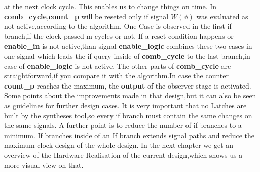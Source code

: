 at the next clock cycle. This enables us to change things on time. 
In \textbf{comb\_cycle},\textbf{count\_p} will be reseted only if signal $W(\phi)$ was evaluated as not active,according to the algorithm.
One Case is observed in the first if branch,if the clock passed m cycles or not. If a reset condition happens or \textbf{enable\_in}
is not active,than signal \textbf{enable\_logic} combines these two cases in one signal which leads the if query inside of \textbf{comb\_cycle} to the last branch,in case of \textbf{enable\_logic}
is not active. The other parts of \textbf{comb\_cycle} are straightforward,if you compare it with the algorithm.In case the counter \textbf{count\_p} reaches the maximum,
the  \textbf{output} of the observer stage is activated.\newline
Some points about the improvements made in that design,but it can also be seen as guidelines for further design cases.
It is very important that no Latches are built by the syntheses tool,so every if branch must contain the same changes on the same signals.
A further point is to reduce the number of if branches to a minimum. If branches inside of an If branch extends signal paths and reduce the maximum clock design of the whole design.
\newline
In the next chapter we get an overview of the Hardware Realisation of the current design,which shows us a more visual view on that.
